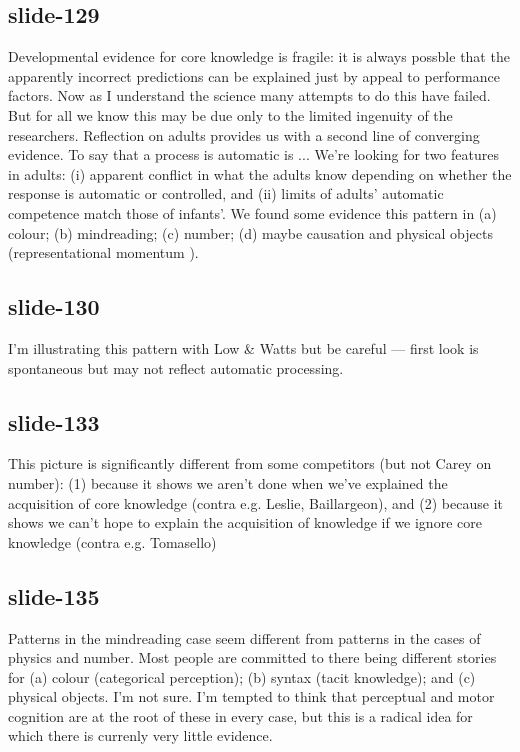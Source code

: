 \documentclass[12pt,\papersize]{extarticle}
\begin{document}
 
\subsection{slide-129}
Developmental evidence for core knowledge is fragile:
it is always possble that the apparently incorrect predictions can be explained just by appeal to performance factors.
Now as I understand the science many attempts to do this have failed.
But for all we know this may be due only to the limited ingenuity of the researchers.
Reflection on adults provides us with a second line of converging evidence.
To say that a process is automatic is ...
We're looking for two features in adults:
(i) apparent conflict in what the adults know depending on whether the response is automatic or controlled,
and (ii) limits of adults' automatic competence match those of infants'.
We found some evidence this pattern in (a) colour; (b) mindreading; (c) number; (d) maybe causation and physical objects (representational momentum \citep{kozhevnikov:2001_impetus}).
 
 
\subsection{slide-130}
I'm illustrating this pattern with Low \& Watts but be careful --- first look is spontaneous but may not reflect automatic processing.
 
 
\subsection{slide-133}
This picture is significantly different from some competitors (but not Carey on number):
(1) because it shows we aren't done when we've explained the acquisition of core knowledge (contra e.g. Leslie, Baillargeon), and
(2) because it shows we can't hope to explain the acquisition of knowledge if we ignore core knowledge (contra e.g. Tomasello)
 
 
\subsection{slide-135}
Patterns in the mindreading case seem different from patterns in the cases of physics and number.
Most people are committed to there being different stories for (a) colour (categorical perception); (b) syntax (tacit knowledge); and (c) physical objects.
I'm not sure. I'm tempted to think that perceptual and motor cognition are at the root of these in every case, but this is a radical idea for which there is currenly very little evidence.
 
\end{document}
